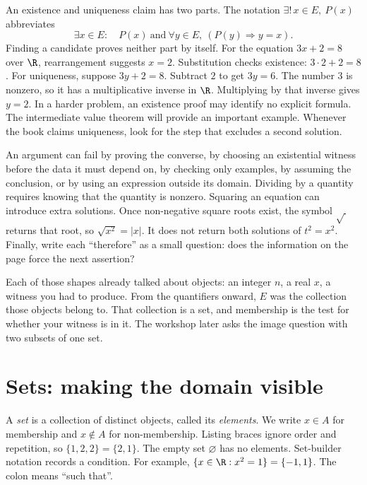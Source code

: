 An existence and uniqueness claim has two parts. The notation $\exists!\, x\in E,\ P(x)$ abbreviates
\[
\exists x\in E:\quad P(x)\ \text{and}\ \forall y\in E,\ (P(y)\Rightarrow y=x).
\]
Finding a candidate proves neither part by itself. For the equation $3x+2=8$ over $\R$, rearrangement suggests $x=2$. Substitution checks existence: $3\cdot 2+2=8$. For uniqueness, suppose $3y+2=8$. Subtract $2$ to get $3y=6$. The number $3$ is nonzero, so it has a multiplicative inverse in $\R$. Multiplying by that inverse gives $y=2$. In a harder problem, an existence proof may identify no explicit formula. The intermediate value theorem will provide an important example. Whenever the book claims uniqueness, look for the step that excludes a second solution.

\begin{reminder}
An argument can fail by proving the converse, by choosing an existential witness before the data it must depend on, by checking only examples, by assuming the conclusion, or by using an expression outside its domain. Dividing by a quantity requires knowing that the quantity is nonzero. Squaring an equation can introduce extra solutions. Once non-negative square roots exist, the symbol $\sqrt{\ }\,$ returns that root, so $\sqrt{x^2}=|x|$. It does not return both solutions of $t^2=x^2$. Finally, write each ``therefore'' as a small question: does the information on the page force the next assertion?
\end{reminder}

Each of those shapes already talked about objects: an integer $n$, a real $x$, a witness you had to produce. From the quantifiers onward, $E$ was the collection those objects belong to. That collection is a set, and membership is the test for whether your witness is in it. The workshop later asks the image question with two subsets of one set.


\section{Sets: making the domain visible}

A \emph{set} is a collection of distinct objects, called its \emph{elements}. We write $x\in A$ for membership and $x\notin A$ for non-membership. Listing braces ignore order and repetition, so $\{1,2,2\}=\{2,1\}$. The empty set $\varnothing$ has no elements. Set-builder notation records a condition. For example, $\{x\in\R:x^2=1\}=\{-1,1\}$. The colon means ``such that''.

